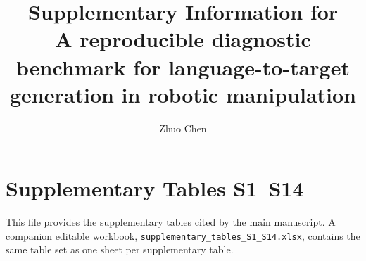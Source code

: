 \documentclass[10pt]{article}
\title{Supplementary Information for\\
A reproducible diagnostic benchmark for language-to-target generation in robotic manipulation}
\author{Zhuo Chen}
\date{}
\begin{document}
\maketitle

\section*{Supplementary Tables S1--S14}

This file provides the supplementary tables cited by the main manuscript. A companion editable workbook, \texttt{supplementary\_tables\_S1\_S14.xlsx}, contains the same table set as one sheet per supplementary table.

\setcounter{table}{0}
\renewcommand{\thetable}{S\arabic{table}}
\renewcommand{\arraystretch}{1.08}































\end{document}
